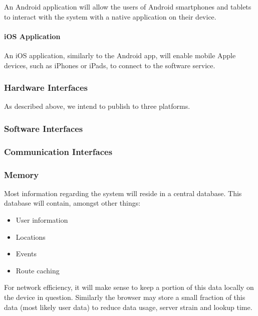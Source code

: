 \documentclass[12pt,a4paper]{article}
\begin{document}
					An Android application will allow the users of Android smartphones
					and tablets to interact with the system with a native application on
					their device.

				\paragraph{iOS Application}

					An iOS application, similarly to the Android app, will enable mobile
					Apple devices, such as iPhones or iPads, to connect to the software
					service.

			\subsubsection{Hardware Interfaces}

				As described above, we intend to publish to three platforms.

			\subsubsection{Software Interfaces}



			\subsubsection{Communication Interfaces}

			\subsubsection{Memory}

				Most information regarding the system will reside in a central
				database. This database will contain, amongst other things:

				\begin{itemize}
					\item User information
					\item Locations
					\item Events
					\item Route caching
				\end{itemize}

				For network efficiency, it will make sense to keep a portion of this
				data locally on the device in question. Similarly the browser may store
				a small fraction of this data (most likely user data) to reduce data
				usage, server strain and lookup time.
\end{document}

